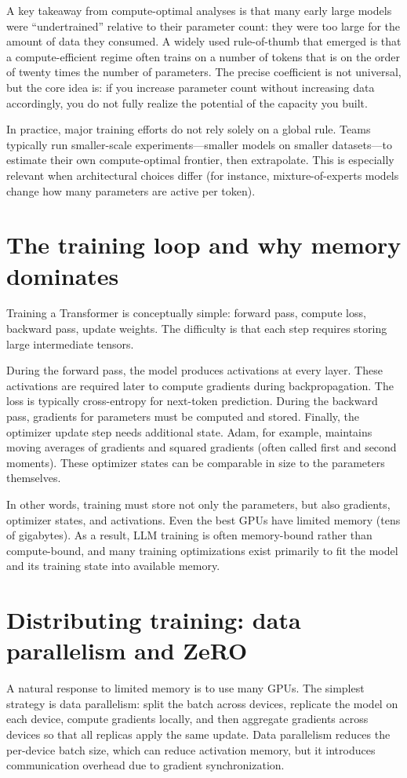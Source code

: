 A key takeaway from compute-optimal analyses is that many early large models were “undertrained” relative to their parameter count: they were too large for the amount of data they consumed. A widely used rule-of-thumb that emerged is that a compute-efficient regime often trains on a number of tokens that is on the order of twenty times the number of parameters. The precise coefficient is not universal, but the core idea is: if you increase parameter count without increasing data accordingly, you do not fully realize the potential of the capacity you built.

In practice, major training efforts do not rely solely on a global rule. Teams typically run smaller-scale experiments—smaller models on smaller datasets—to estimate their own compute-optimal frontier, then extrapolate. This is especially relevant when architectural choices differ (for instance, mixture-of-experts models change how many parameters are active per token).

\section{The training loop and why memory dominates}
Training a Transformer is conceptually simple: forward pass, compute loss, backward pass, update weights. The difficulty is that each step requires storing large intermediate tensors.

During the forward pass, the model produces activations at every layer. These activations are required later to compute gradients during backpropagation. The loss is typically cross-entropy for next-token prediction. During the backward pass, gradients for parameters must be computed and stored. Finally, the optimizer update step needs additional state. Adam, for example, maintains moving averages of gradients and squared gradients (often called first and second moments). These optimizer states can be comparable in size to the parameters themselves.

In other words, training must store not only the parameters, but also gradients, optimizer states, and activations. Even the best GPUs have limited memory (tens of gigabytes). As a result, LLM training is often memory-bound rather than compute-bound, and many training optimizations exist primarily to fit the model and its training state into available memory.

\section{Distributing training: data parallelism and ZeRO}
A natural response to limited memory is to use many GPUs. The simplest strategy is data parallelism: split the batch across devices, replicate the model on each device, compute gradients locally, and then aggregate gradients across devices so that all replicas apply the same update. Data parallelism reduces the per-device batch size, which can reduce activation memory, but it introduces communication overhead due to gradient synchronization.

